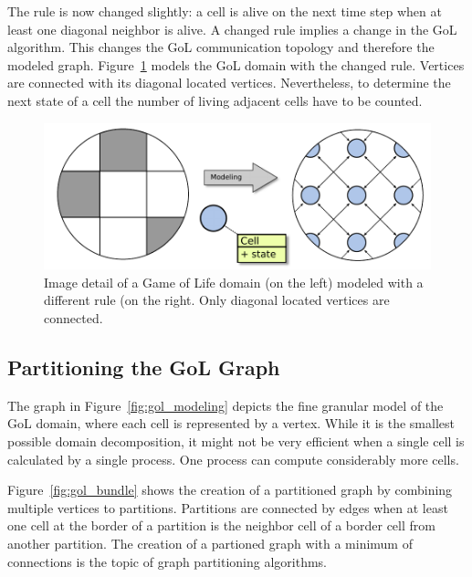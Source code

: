 \noindent The rule is now changed slightly: a cell is alive on the next time
step when at least one diagonal neighbor is alive.  A changed rule
 implies a change in the GoL algorithm.  This changes the GoL
communication topology and therefore the modeled
graph. Figure~\ref{fig:gol_modeling_changed} models the GoL domain
with the changed rule. Vertices are connected with its diagonal
located vertices. Nevertheless, to determine the next state of a cell
the number of living adjacent cells have to be counted.

\begin{figure}[H]
  \centering \includegraphics[width=\textwidth]{graphics/30_gol_modeling_changed}
  \caption{Image detail of a Game of Life domain (on the left)
    modeled with a different rule (on the right. Only diagonal located
    vertices are connected.}
  \label{fig:gol_modeling_changed}
\end{figure}


\subsection{Partitioning the GoL Graph}
The graph in Figure~\ref{fig:gol_modeling} depicts the fine granular
model of the GoL domain, where each cell is represented by a vertex.
While it is the smallest possible domain decomposition, it might not
be very efficient when a single cell is calculated by a single
process. One process can compute considerably more cells.

Figure~\ref{fig:gol_bundle} shows the creation of a partitioned graph
by combining multiple vertices to partitions. Partitions are connected by edges when at least one cell at
the border of a partition is the neighbor cell of a border cell from
another partition.  The creation of a partioned graph  with a
minimum of connections is the topic of graph partitioning algorithms.

